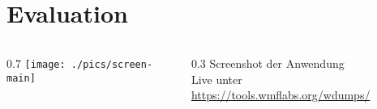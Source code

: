 \documentclass[aspectratio=1610,xcolor=svgnames]{beamer}
\begin{document}
\section{Evaluation}

\begin{frame}[plain]
  \centering
  \begin{columns}
    \begin{column}{0.7\framewidth}
      \texttt{[image: ./pics/screen-main]}
    \end{column}
    \begin{column}{0.3\framewidth}
      Screenshot der Anwendung
      \\ \vspace{1cm}
      Live unter \url{https://tools.wmflabs.org/wdumps/}
    \end{column}
  \end{columns}
\end{frame}
\end{document}
